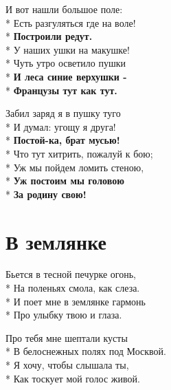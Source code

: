 \medskip

\begin{minipage}{\linewidth}
И вот нашли большое поле:\\*
Есть разгуляться где на воле!\\*
\textbf{Построили редут.}\\*
У наших ушки на макушке!\\*
Чуть утро осветило пушки\\*
\textbf{И леса синие верхушки -}\\*
\textbf{Французы тут как тут.}\\
\end{minipage}\par\medskip\nobreak

\medskip

\begin{minipage}{\linewidth}
Забил заряд я в пушку туго\\*
И думал: угощу я друга!\\*
\textbf{Постой-ка, брат мусью!}\\*
Что тут хитрить, пожалуй к бою;\\*
Уж мы пойдем ломить стеною,\\*
\textbf{Уж постоим мы головою}\\*
\textbf{За родину свою!}\\
\end{minipage}

\vspace{\fill}\newpage

\section{В землянке}
\label{song:В_землянке}

\medskip

\begin{minipage}{\linewidth}
Бьется в тесной печурке огонь,\\*
На поленьях смола, как слеза.\\*
И поет мне в землянке гармонь\\*
Про улыбку твою и глаза.\\
\end{minipage}\par\medskip\nobreak

\medskip

\begin{minipage}{\linewidth}
Про тебя мне шептали кусты \\*
В белоснежных полях под Москвой.\\*
Я хочу, чтобы слышала ты,\\*
Как тоскует мой голос живой.\\
\end{minipage}\par\medskip\nobreak


